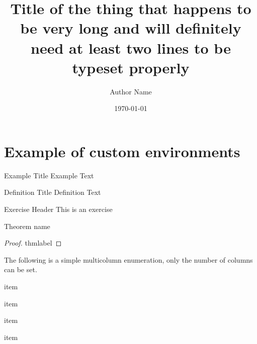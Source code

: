 \documentclass{uhcourse}
\title{Title of the thing that happens to be very long and will definitely need at least two lines to be typeset properly}
\author{Author Name}
\date{\today}
\begin{document}
\maketitle
\thispagestyle{empty}

\clearpage
\hypertarget{contents}{}
\thispagestyle{fancy}
\tableofcontents

\clearpage
\section{Example of custom environments}
\lipsum[1]
\begin{example}{Example Title}
    Example Text
    \lipsum[66]
\end{example}


\begin{definition}{Definition Title}
    Definition Text
    \lipsum[66]
\end{definition}

\begin{exercise}{Exercise Header}
    This is an exercise
    \lipsum[66]
\end{exercise}

\begin{theorem}[thmlabel]{Theorem name}
    \lipsum[66]
\end{theorem}

\begin{proof}{thmlabel}
    \lipsum[66]
\end{proof}

The following is a simple multicolumn enumeration, only the number of columns can be set.
\begin{enumulti}{2}
    \item{item}
    \item{item}
    \item{item}
    \item{item}
\end{enumulti}


\listofexercises
\end{document}
